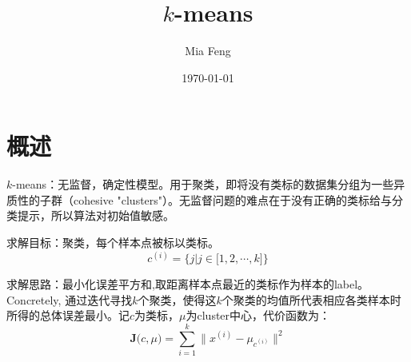 \documentclass{ctexart}
\title{$k$-means} %
\author{Mia Feng} %
\date{\today} %
\begin{document}
\maketitle %




\section{概述}
$k$-means：无监督，确定性模型。用于聚类，即将没有类标的数据集分组为一些异质性的子群（cohesive "clusters"）\cite{stanf:cs229}。无监督问题的难点在于没有正确的类标给与分类提示，所以算法对初始值敏感。

求解目标：聚类，每个样本点被标以类标。
\begin{equation}
c^{\left(i\right)} = \big\{j|j\in\big[ 1,2,\cdots,k \big]\big\}
\end{equation}

求解思路：最小化误差平方和,取距离样本点最近的类标作为样本的label。Concretely, 通过迭代寻找$k$个聚类，使得这$k$个聚类的均值所代表相应各类样本时所得的总体误差最小。记$c$为类标，$\mu$为cluster中心，代价函数为\cite{kmeans:implement}：
\begin{equation}
\boldsymbol{J}\big(c,\mu \big)=\sum\limits_{i=1}^{k}\big\| x^{\left(i\right)}-\mu_{c^{\left(i\right)}}\big\|^2
\end{equation}
\end{document}
